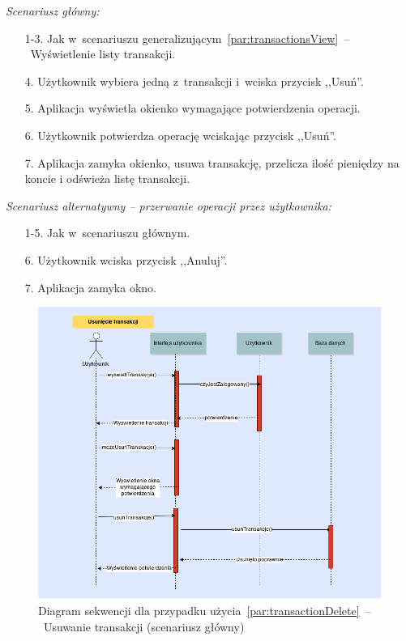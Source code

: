 \noindent \textit{Scenariusz główny:}
\begin{enumerate}
  \item[1-3.] Jak w~scenariuszu generalizującym~\ref{par:transactionsView}~--~Wyświetlenie listy transakcji.
  \item[4.] Użytkownik wybiera jedną z~transakcji i~wciska przycisk ,,Usuń''.
  \item[5.] Aplikacja wyświetla okienko wymagające potwierdzenia operacji.
  \item[6.] Użytkownik potwierdza operację wciskając przycisk ,,Usuń''.
  \item[7.] Aplikacja zamyka okienko, usuwa transakcję, przelicza ilość pieniędzy na koncie i odświeża listę transakcji.
\end{enumerate}

\noindent \textit{Scenariusz alternatywny -- przerwanie operacji przez użytkownika:}
\begin{enumerate}
  \item[1-5.] Jak w~scenariuszu głównym.
  \item[6.] Użytkownik wciska przycisk ,,Anuluj''.
  \item[7.] Aplikacja zamyka okno.
\end{enumerate}

\begin{figure}[H]
  \includegraphics[width=\textwidth]{images/usun_transakcje.png}
  \caption{Diagram sekwencji dla przypadku użycia~\ref{par:transactionDelete}~--~Usuwanie transakcji (scenariusz główny)}
\end{figure}

